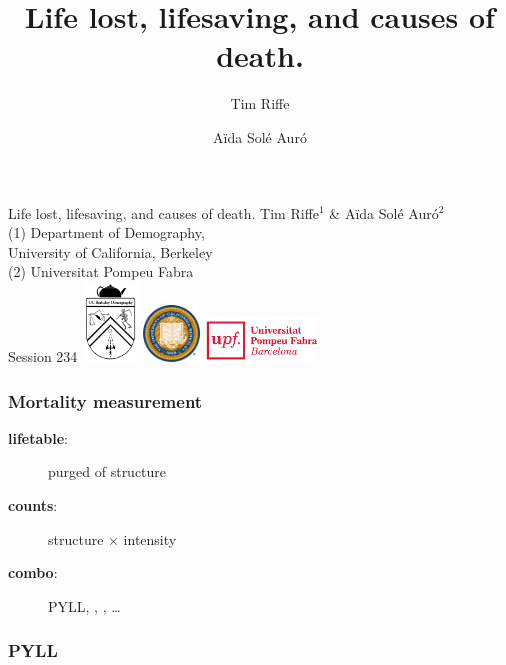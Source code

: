 \documentclass{beamer}
\title[Years Lost]{Life lost, lifesaving, and causes of death.}
\author[Riffe \& Sol\'{e}]
{
Tim Riffe \inst{1} \and A{\"i}da Sol\'{e} Aur\'{o} \inst{2}}
\institute %
{
  \inst{1}%
  Department of Demography, \\
  University of California, Berkeley \\
  \and
  \inst{2} Universitat Pompeu Fabra
}
\begin{document}
\begin{frame}[plain]

\vspace{3em}
\LARGE Life lost, lifesaving, and causes of death.
\vspace{1em}
\normalsize Tim Riffe$^1$ \& A{\"i}da Sol\'{e} Aur\'{o}$^2$\\

 \small{(1)} Department of Demography, \\
  University of California, Berkeley \\
  \small{(2)} Universitat Pompeu Fabra\\
  \vspace{5 mm}
  Session 234 
  \vspace{10 mm}
  \includegraphics[width=1.5cm]{Figures/demogcrest}\hspace{1cm}
  \includegraphics[width=1.5cm]{Figures/ucbseal1}\hspace{1cm}
  \includegraphics[height=1.2cm]{Figures/UPFcmyk}
\end{frame}


\begin{frame}
\frametitle{Mortality measurement}
\begin{description}
\item[\textbf{lifetable}:] purged of structure
\item[\textbf{counts}:] structure $\times$ intensity
\item[\textbf{combo}:] PYLL, \underline{\hspace{1cm}}, \underline{\hspace{1cm}},
\ldots
\end{description}

\end{frame}

\begin{frame}
\frametitle{PYLL}
\end{frame}
\begin{frame}

\end{frame}
\begin{frame}

\end{frame}
\begin{frame}

\end{frame}
\end{document}
